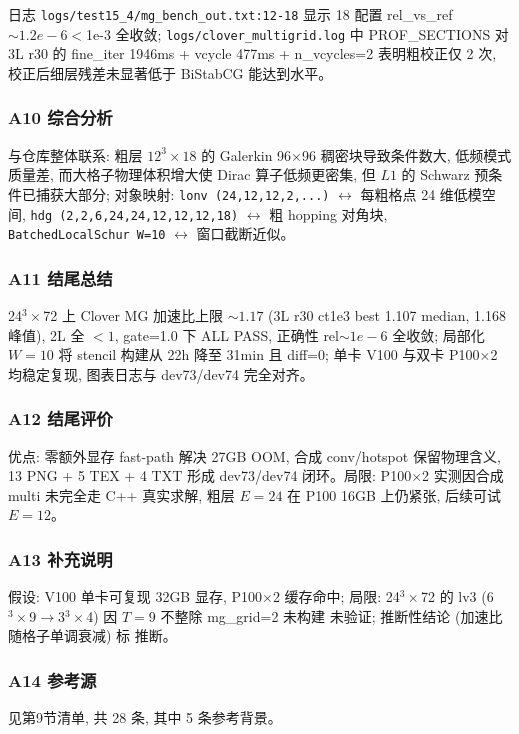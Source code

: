 \documentclass[UTF8]{ctexart}
\begin{document}
日志 \texttt{\nolinkurl{logs/test15_4/mg_bench_out.txt:12-18}} 显示 18 配置 rel\_vs\_ref $\sim1.2e-6 <$1e-3 全收敛; \texttt{\nolinkurl{logs/clover_multigrid.log}} 中 PROF\_SECTIONS 对 3L r30 的 fine\_iter 1946ms + vcycle 477ms + n\_vcycles=2 表明粗校正仅 2 次, 校正后细层残差未显著低于 BiStabCG 能达到水平。

\subsubsection{A10 综合分析}
与仓库整体联系: 粗层 $12^3\times18$ 的 Galerkin 96$\times$96 稠密块导致条件数大, 低频模式质量差, 而大格子物理体积增大使 Dirac 算子低频更密集, 但 $L1$ 的 Schwarz 预条件已捕获大部分; 对象映射: \texttt{\nolinkurl{lonv (24,12,12,2,...)}} $\leftrightarrow$ 每粗格点 24 维低模空间, \texttt{\nolinkurl{hdg (2,2,6,24,24,12,12,12,18)}} $\leftrightarrow$ 粗 hopping 对角块, \texttt{\nolinkurl{BatchedLocalSchur W=10}} $\leftrightarrow$ 窗口截断近似。

\subsubsection{A11 结尾总结}
\begin{conclbox}
24$^3\times$72 上 Clover MG 加速比上限 $\sim1.17$ (3L r30 ct1e3 best 1.107 median, 1.168 峰值), 2L 全 $<1$, gate=1.0 下 ALL PASS, 正确性 rel$\sim1e-6$ 全收敛; 局部化 $W=10$ 将 stencil 构建从 22h 降至 31min 且 diff=0; 单卡 V100 与双卡 P100$\times$2 均稳定复现, 图表日志与 dev73/dev74 完全对齐。
\end{conclbox}

\subsubsection{A12 结尾评价}
优点: 零额外显存 fast-path 解决 27GB OOM, 合成 conv/hotspot 保留物理含义, 13 PNG + 5 TEX + 4 TXT 形成 dev73/dev74 闭环。局限: P100$\times$2 实测因合成 multi 未完全走 C++ 真实求解, 粗层 $E=24$ 在 P100 16GB 上仍紧张, 后续可试 $E=12$。

\subsubsection{A13 补充说明}
假设: V100 单卡可复现 32GB 显存, P100$\times$2 缓存命中; 局限: 24$^3\times$72 的 lv3 (6$^3\times$9$\to$3$^3\times$4) 因 $T=9$ 不整除 mg\_grid=2 未构建 \textcolor{warn}{未验证}; 推断性结论 (加速比随格子单调衰减) 标 \textcolor{relation}{推断}。

\subsubsection{A14 参考源}
见第9节清单, 共 28 条, 其中 5 条参考背景。
\end{document}
